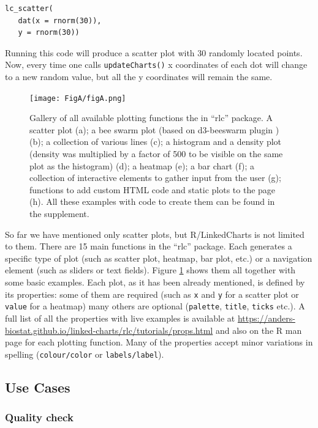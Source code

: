 \documentclass[twocolumn,10pt]{article}
\begin{document}
\begin{verbatim}
lc_scatter(
   dat(x = rnorm(30)),
   y = rnorm(30))
\end{verbatim}

Running this code will produce a scatter plot with 30 randomly located points. Now, every time one calls \texttt{updateCharts()} x coordinates of each dot will change to a new random value, but all the y coordinates will remain the same.


\begin{figure}[t]
	\texttt{[image: FigA/figA.png]}
	\caption{Gallery of all available plotting functions the in ``rlc'' package. A scatter plot (a); a bee swarm plot (based on d3-beeswarm plugin \citep{lebeau_2017}) (b); a collection of various lines (c); a histogram and a density plot (density was multiplied by a factor of 500 to be visible on the same plot as the histogram) (d); a heatmap (e); a bar chart (f); a collection of interactive elements to gather input from the user (g); functions to add custom HTML code and static plots to the page (h). All these examples with code to create them can be found in the supplement.}
	\label{FigA}
\end{figure}

So far we have mentioned only scatter plots, but R/LinkedCharts is not limited to them. There are 15 main functions in the ``rlc'' package. Each generates a specific type of plot (such as scatter plot, heatmap, bar plot, etc.) or a navigation element (such as sliders or text fields). Figure \ref{FigA} shows them all together with some basic examples. Each plot, as it has been already mentioned, is defined by its properties: some of them are required (such as \texttt{x} and \texttt{y} for a scatter plot or \texttt{value} for a heatmap) many others are optional (\texttt{palette}, \texttt{title}, \texttt{ticks} etc.). A full list of all the properties with live examples is available at \url{https://anders-biostat.github.io/linked-charts/rlc/tutorials/props.html} and also on the R man page for each plotting function. Many of the properties accept minor variations in spelling (\texttt{colour/color} or \texttt{labels/label}).

\subsection{Use Cases}
\subsubsection{Quality check}
\end{document}
